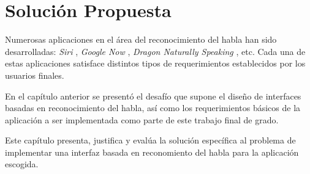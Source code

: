 \chapter{Soluci\'on Propuesta}
\label{sec:solucion}

Numerosas aplicaciones en el \'area del reconocimiento del habla han sido desarrolladas: \emph{Siri} \cite{AppleSiri}, \emph{Google Now} \cite{GoogleNow}, 
\emph{Dragon Naturally Speaking} \cite{DragonNaturallySpeaking}, etc. Cada una de estas
aplicaciones satisface distintos tipos de requerimientos establecidos por los usuarios finales. 

En el cap\'itulo anterior se presentó el desafío que supone el diseño de interfaces basadas 
en reconocimiento del habla, así como los requerimientos básicos de la aplicación a ser implementada como 
parte de este trabajo final de grado.

Este cap\'itulo presenta, justifica y eval\'ua la soluci\'on espec\'ifica al problema de implementar una interfaz
basada en reconomiento del habla para la aplicaci\'on escogida.




